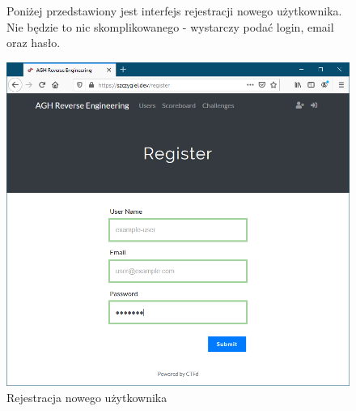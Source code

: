 \documentclass[polish,12pt]{aghthesis}
\begin{document}
\begin{figure}[ht]
    Poniżej przedstawiony jest interfejs rejestracji nowego użytkownika.
    Nie będzie to nic skomplikowanego - wystarczy podać login, email oraz hasło.

    \vspace{1cm}

    \centering
    \includegraphics[width=14cm]{szczygiel_dev_register}
    \caption{Rejestracja nowego użytkownika}
    \label{fig:szczygiel_dev_register}
\end{figure}
\end{document}
